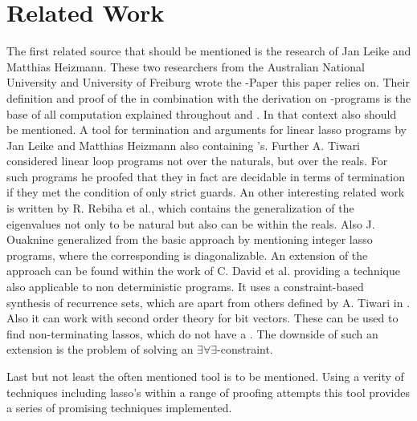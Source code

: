 \chapter{Related Work}
\label{chapter:related-work}

The first related source that should be mentioned is the research of Jan Leike and Matthias Heizmann. These two researchers from the Australian National University and University of Freiburg wrote the \gna-Paper this paper relies on. Their definition and proof of the \gna in combination with the derivation on \lasso-programs is the base of all computation explained throughout  and . \cite{leike2014geometric} \newline
In that context also  should be mentioned. A tool for termination and \nonterm arguments for linear lasso programs by Jan Leike and Matthias Heizmann also containing \gna's. \cite{LassoRanker}\newline
Further A. Tiwari considered linear loop programs not over the naturals, but over the reals. For such programs he proofed that they in fact are decidable in terms of termination if they met the condition of only strict guards. \cite{tiwari2004termination} \newline
An other interesting related work is written by R. Rebiha et al., which contains the generalization of the eigenvalues not only to be natural but also can be within the reals. \cite{rebiha2014characterization} Also J. Ouaknine generalized from the basic approach by mentioning integer lasso programs, where the corresponding \updatematrix is diagonalizable. \cite{ouaknine2014termination} \newline
An extension of the \gna approach can be found within the work of C. David et al. providing a technique also applicable to non deterministic programs. It uses a constraint-based synthesis of recurrence sets, which are apart from others defined by A. Tiwari in \cite{tiwari2004termination}. Also it can work with second order theory for bit vectors. These can be used to find non-terminating lassos, which do not have a \gna. The downside of such an extension is the problem of solving an $\exists\forall\exists$-constraint. \cite{david2015unrestricted} \cite{leike2014geometric}

Last but not least the often mentioned tool \aprove is to be mentioned. Using a verity of techniques including lasso's within a range of proofing attempts this tool provides a series of promising techniques implemented. 

